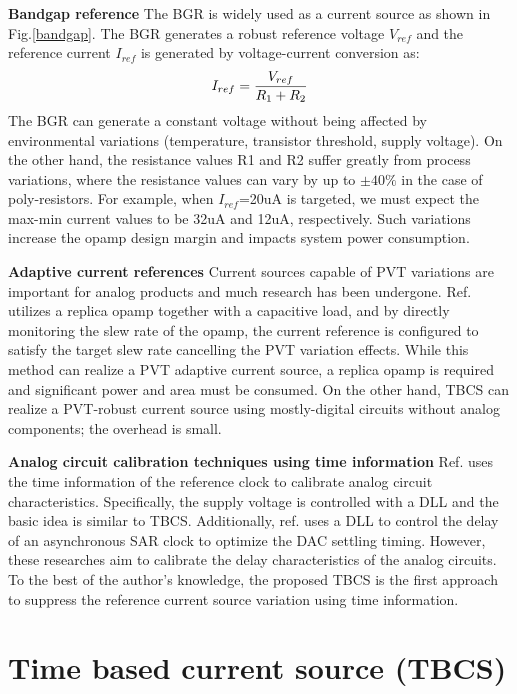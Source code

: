 \documentclass[letterpaper, 10 pt, conference]{ieeeconf}  %
\begin{document}
\textbf{Bandgap reference} The BGR is widely used as a current source as shown in Fig.\ref{bandgap}. The BGR generates a robust reference voltage $V_{ref}$ and the reference current $I_{ref}$ is generated by voltage-current conversion as:
\begin{eqnarray}
    \centering
    I_{ref} = \frac{V_{ref}}{R_1 + R_2}
    \label{sar13b}
\end{eqnarray}
The BGR can generate a constant voltage without being affected by environmental variations (temperature, transistor threshold, supply voltage). On the other hand, the resistance values R1 and R2 suffer greatly from process variations, where the resistance values can vary by up to $\pm 40\%$ in the case of poly-resistors. For example, when $I_{ref}$=20uA is targeted, we must expect the max-min current values to be 32uA and 12uA, respectively. Such variations increase the opamp design margin and impacts system power consumption.

\textbf{Adaptive current references} Current sources capable of PVT variations are important for analog products and much research has been undergone. Ref.\cite{chuanyang,ron} utilizes a replica opamp together with a capacitive load, and by directly monitoring the slew rate of the opamp, the current reference is configured to satisfy the target slew rate cancelling the PVT variation effects.
While this method can realize a PVT adaptive current source, a replica opamp is required and significant power and area must be consumed. On the other hand, TBCS can realize a PVT-robust current source using mostly-digital circuits without analog components; the overhead is small.

\textbf{Analog circuit calibration techniques using time information} Ref.\cite{zhu} uses the time information of the reference clock to calibrate analog circuit characteristics. Specifically, the supply voltage is controlled with a DLL and the basic idea is similar to TBCS. Additionally, ref.\cite{kapusta201314b,tomson} uses a DLL to control the delay of an asynchronous SAR clock to optimize the DAC settling timing.
However, these researches aim to calibrate the delay characteristics of the analog circuits. To the best of the author's knowledge, the proposed TBCS is the first approach to suppress the reference current source variation using time information.


\section{Time based current source (TBCS)}
\end{document}
